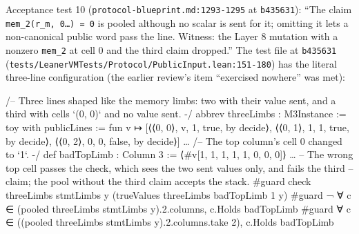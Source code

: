 Acceptance test 10 (\texttt{p\allowbreak{}r\allowbreak{}o\allowbreak{}t\allowbreak{}o\allowbreak{}c\allowbreak{}o\allowbreak{}l\allowbreak{}-{}\allowbreak{}b\allowbreak{}l\allowbreak{}u\allowbreak{}e\allowbreak{}p\allowbreak{}r\allowbreak{}i\allowbreak{}n\allowbreak{}t\allowbreak{}.\allowbreak{}m\allowbreak{}d\allowbreak{}:\allowbreak{}1\allowbreak{}2\allowbreak{}9\allowbreak{}3\allowbreak{}-{}\allowbreak{}1\allowbreak{}2\allowbreak{}9\allowbreak{}5} at \texttt{b435631}): \enquote{The claim \texttt{mem\_\allowbreak{}2(\allowbreak{}r\_\allowbreak{}m,\allowbreak{} 0…) = 0} is pooled although no scalar is sent for it; omitting it lets a non-canonical public word pass the line. Witness: the Layer 8 mutation with a nonzero \texttt{mem\_\allowbreak{}2} at cell 0 and the third claim dropped.} The test file at \texttt{b435631} (\texttt{t\allowbreak{}e\allowbreak{}s\allowbreak{}t\allowbreak{}s\allowbreak{}/\allowbreak{}L\allowbreak{}e\allowbreak{}a\allowbreak{}n\allowbreak{}e\allowbreak{}r\allowbreak{}V\allowbreak{}M\allowbreak{}T\allowbreak{}e\allowbreak{}s\allowbreak{}t\allowbreak{}s\allowbreak{}/\allowbreak{}P\allowbreak{}r\allowbreak{}o\allowbreak{}t\allowbreak{}o\allowbreak{}c\allowbreak{}o\allowbreak{}l\allowbreak{}/\allowbreak{}P\allowbreak{}u\allowbreak{}b\allowbreak{}l\allowbreak{}i\allowbreak{}c\allowbreak{}I\allowbreak{}n\allowbreak{}p\allowbreak{}u\allowbreak{}t\allowbreak{}.\allowbreak{}l\allowbreak{}e\allowbreak{}a\allowbreak{}n\allowbreak{}:\allowbreak{}1\allowbreak{}5\allowbreak{}1\allowbreak{}-{}\allowbreak{}1\allowbreak{}8\allowbreak{}0}) has the literal three-line configuration (the earlier review's item \enquote{exercised nowhere} was met):

\begin{leancode}
/-- Three lines shaped like the memory limbs: two with their value sent, and a third with cells
`(0, 0)` and no value sent. -/
abbrev threeLimbs : M3Instance :=
  { toy with publicLines := fun v ↦
      [⟨⟨0, 0⟩, v, 1, true, by decide⟩, ⟨⟨0, 1⟩, 1, 1, true, by decide⟩,
        ⟨⟨0, 2⟩, 0, 0, false, by decide⟩] }
…
/-- The top column's cell 0 changed to `1`. -/
def badTopLimb : Column 3 := ⟨#v[1, 1, 1, 1, 1, 0, 0, 0]⟩
…
-- The wrong top cell passes the check, which sees the two sent values only, and fails the third
-- claim; the pool without the third claim accepts the stack.
#guard check threeLimbs stmtLimbs y (trueValues threeLimbs badTopLimb 1 y)
#guard ¬ ∀ c ∈ (pooled threeLimbs stmtLimbs y).2.columns, c.Holds badTopLimb
#guard ∀ c ∈ ((pooled threeLimbs stmtLimbs y).2.columns.take 2), c.Holds badTopLimb
\end{leancode}

